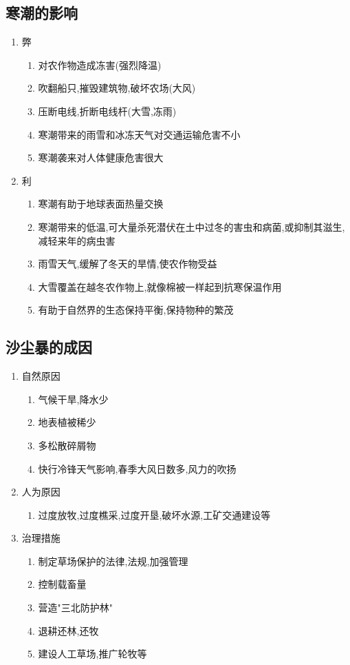 \documentclass[a4paper]{article}
\begin{document}
    \subsection{寒潮的影响}
    \begin{enumerate}
        \item 弊
        \begin{enumerate}
            \item 对农作物造成冻害(强烈降温)
            \item 吹翻船只,摧毁建筑物,破坏农场(大风)
            \item 压断电线,折断电线杆(大雪,冻雨)
            \item 寒潮带来的雨雪和冰冻天气对交通运输危害不小
            \item 寒潮袭来对人体健康危害很大
        \end{enumerate}
        \item 利
        \begin{enumerate}
            \item 寒潮有助于地球表面热量交换
            \item 寒潮带来的低温,可大量杀死潜伏在土中过冬的害虫和病菌,或抑制其滋生,减轻来年的病虫害
            \item 雨雪天气,缓解了冬天的旱情,使农作物受益
            \item 大雪覆盖在越冬农作物上,就像棉被一样起到抗寒保温作用
            \item 有助于自然界的生态保持平衡,保持物种的繁茂
        \end{enumerate}
    \end{enumerate}
    \subsection{沙尘暴的成因}
    \begin{enumerate}
        \item 自然原因
        \begin{enumerate}
            \item 气候干旱,降水少
            \item 地表植被稀少
            \item 多松散碎屑物
            \item 快行冷锋天气影响,春季大风日数多,风力的吹扬
        \end{enumerate}
        \item 人为原因
        \begin{enumerate}
            \item 过度放牧,过度樵采,过度开垦,破坏水源,工矿交通建设等
        \end{enumerate}
        \item 治理措施
        \begin{enumerate}
            \item 制定草场保护的法律,法规,加强管理
            \item 控制载畜量
            \item 营造"三北防护林"
            \item 退耕还林,还牧
            \item 建设人工草场,推广轮牧等
        \end{enumerate}
    \end{enumerate}
\end{document}

